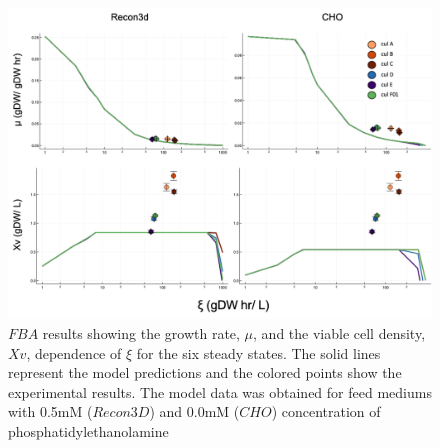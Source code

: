 	\begin{figure}[H]
		\includegraphics[scale = 0.5]{low_medium_1}
		\caption{$FBA$ results showing the growth rate, $\mu$, and the viable cell density, $Xv$, dependence of $\xi$ for the six steady states. The solid lines represent the model predictions and the colored points show the experimental results. The model data was obtained for feed mediums with 0.5mM ($Recon3D$) and 0.0mM ($CHO$) concentration of phosphatidylethanolamine}
		
	\end{figure}